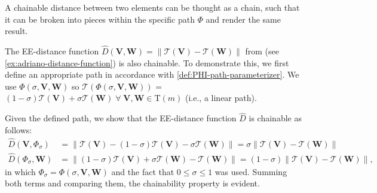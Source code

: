 A chainable distance between two elements can be thought as a chain, such that it can be broken into pieces within the specific path $\Phi$ and render the same result.
\begin{example} \label{ex:chainability}
    The EE-distance function $\widehat{D}(\mathbf{V}, \mathbf{W})=\|\mathcal{T}(\mathbf{V}) - \mathcal{T}(\mathbf{W})\|$ from \citet{Rezende2022} (see \cref{ex:adriano-distance-function}) is also chainable. To demonstrate this, we first define an appropriate path in accordance with \cref{def:PHI-path-parameterizer}. We use $\Phi(\sigma, \mathbf{V}, \mathbf{W})$ so $\mathcal{T}(\Phi(\sigma, \mathbf{V}, \mathbf{W}))$ = $(1 - \sigma)\mathcal{T}(\mathbf{V}) + \sigma \mathcal{T}(\mathbf{W})\;\forall\;\mathbf{V},\mathbf{W}\in \text{T}(m)$ (i.e., a linear path).

    Given the defined path, we show that the EE-distance function $\widehat{D}$ is chainable as follows:
    \begin{align}
            \widehat{D}(\mathbf{V}, \Phi_\sigma) &= \|\mathcal{T}(\mathbf{V}) - (1 - \sigma)\mathcal{T}(\mathbf{V}) - \sigma \mathcal{T}(\mathbf{W})\|
            =\sigma\|\mathcal{T}(\mathbf{V})-\mathcal{T}(\mathbf{W})\|  \label{eq:example-adriano-chainable-DvPhi}
        \\
            \widehat{D}(\Phi_\sigma, \mathbf{W}) &= \|(1 - \sigma)\mathcal{T}(\mathbf{V}) + \sigma \mathcal{T}(\mathbf{W}) - \mathcal{T}(\mathbf{W})\|
            =(1-\sigma)\|\mathcal{T}(\mathbf{V})-\mathcal{T}(\mathbf{W})\|,
    \end{align}
    in which $\Phi_{\sigma} = \Phi(\sigma,\mathbf{V},\mathbf{W})$ and the fact that $0\le \sigma \le 1$ was used. Summing both terms and comparing them, the chainability property is evident. 
\end{example}


